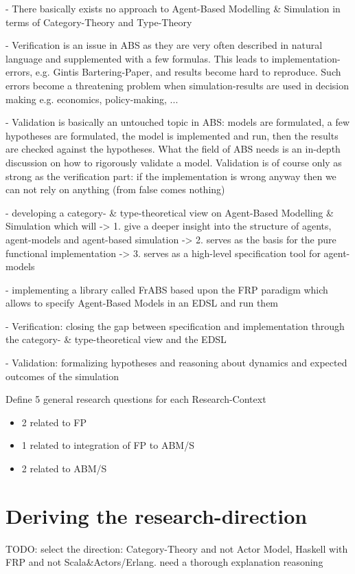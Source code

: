 - There basically exists no approach to Agent-Based Modelling \& Simulation in terms of Category-Theory and Type-Theory

- Verification is an issue in ABS as they are very often described in natural language and supplemented with a few formulas. This leads to implementation-errors, e.g. Gintis Bartering-Paper, and results become hard to reproduce. Such errors become a threatening problem when simulation-results are used in decision making e.g. economics, policy-making, ...

- Validation is basically an untouched topic in ABS: models are formulated, a few hypotheses are formulated, the model is implemented and run, then the results are checked against the hypotheses. What the field of ABS needs is an in-depth discussion on how to rigorously validate a model. Validation is of course only as strong as the verification part: if the implementation is wrong anyway then we can not rely on anything (from false comes nothing)


- developing a category- \& type-theoretical view on Agent-Based Modelling \& Simulation which will 
	-> 1. give a deeper insight into the structure of agents, agent-models and agent-based simulation
	-> 2. serves as the basis for the pure functional implementation
	-> 3. serves as a high-level specification tool for agent-models

- implementing a library called FrABS based upon the FRP paradigm which allows to specify Agent-Based Models in an EDSL and run them

- Verification: closing the gap between specification and implementation through the category- \& type-theoretical view and the EDSL

- Validation: formalizing hypotheses and reasoning about dynamics and expected outcomes of the simulation

Define 5 general research questions for each Research-Context
	\begin{itemize}
    \item 2 related to FP
    \item 1 related to integration of FP to ABM/S
    \item 2 related to ABM/S
    \end{itemize}
    
\section{Deriving the research-direction}
TODO: select the direction: Category-Theory and not Actor Model, Haskell with FRP and not Scala\&Actors/Erlang. need a thorough explanation reasoning

